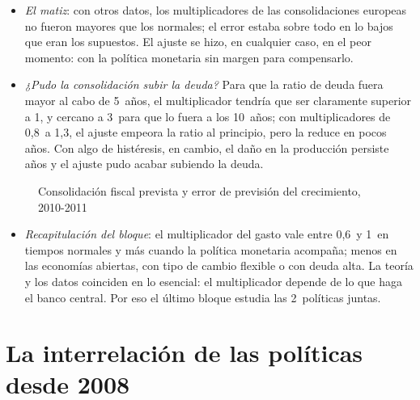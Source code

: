 \documentclass[11pt]{article}
\begin{document}
\begin{itemize}
\begin{itemize}
  \end{itemize}
\item \emph{El matiz}: con otros datos, los multiplicadores de las consolidaciones europeas no fueron mayores que los normales; el error estaba sobre todo en lo bajos que eran los supuestos\nocite{Ramey2019Ten}. El ajuste se hizo, en cualquier caso, en el peor momento: con la política monetaria sin margen para compensarlo.
\item \emph{¿Pudo la consolidación subir la deuda?} Para que la ratio de deuda fuera mayor al cabo de 5~años, el multiplicador tendría que ser claramente superior a 1, y cercano a 3~para que lo fuera a los 10~años; con multiplicadores de 0,8~a 1,3, el ajuste empeora la ratio al principio, pero la reduce en pocos años\nocite{WarmedingerEtAl2015}. Con algo de histéresis, en cambio, el daño en la producción persiste años y el ajuste pudo acabar subiendo la deuda\nocite{FatasSummers2018Permanent}.
\end{itemize}

\begin{figure}[H]
\centering
\caption{Consolidación fiscal prevista y error de previsión del crecimiento, 2010-2011}\label{fig:blanchard-leigh}
\end{figure}

\begin{itemize}
\item \emph{Recapitulación del bloque}: el multiplicador del gasto vale entre 0,6~y 1~en tiempos normales y más cuando la política monetaria acompaña; menos en las economías abiertas, con tipo de cambio flexible o con deuda alta. La teoría y los datos coinciden en lo esencial: el multiplicador depende de lo que haga el banco central. Por eso el último bloque estudia las 2~políticas juntas.
\end{itemize}

\section{La interrelación de las políticas desde 2008}\label{sec:interrelacion}
\end{document}
